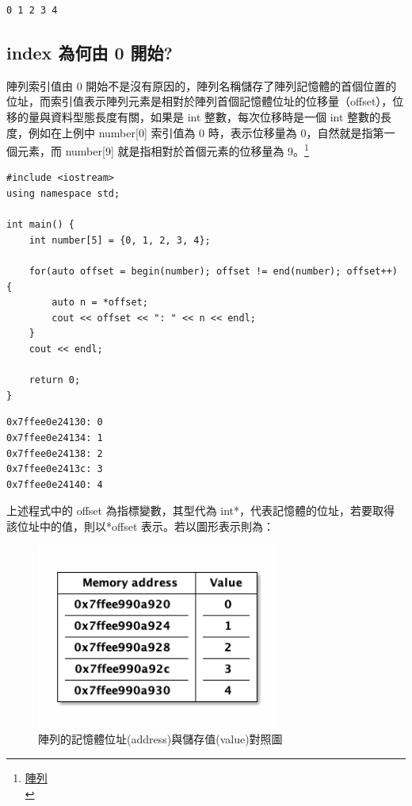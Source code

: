 \documentclass[a4paper,12pt]{article}
\begin{document}
\begin{verbatim}
0 1 2 3 4
\end{verbatim}
\subsection{index 為何由 0 開始?}
\label{sec:org2540741}
陣列索引值由 0 開始不是沒有原因的，陣列名稱儲存了陣列記憶體的首個位置的位址，而索引值表示陣列元素是相對於陣列首個記憶體位址的位移量（offset），位移的量與資料型態長度有關，如果是 int 整數，每次位移時是一個 int 整數的長度，例如在上例中 number[0] 索引值為 0 時，表示位移量為 0，自然就是指第一個元素，而 number[9] 就是指相對於首個元素的位移量為 9。\footnote{\href{https://openhome.cc/Gossip/CppGossip/OneDimArray.html}{陣列}\\}\\

\lstset{breaklines=true,language=cpp,label= ,caption= ,captionpos=b,firstnumber=1,numbers=left}
\begin{lstlisting}
#include <iostream>
using namespace std;

int main() {
    int number[5] = {0, 1, 2, 3, 4};

    for(auto offset = begin(number); offset != end(number); offset++) {
        auto n = *offset;
        cout << offset << ": " << n << endl;
    }
    cout << endl;

    return 0;
}
\end{lstlisting}

\begin{verbatim}
0x7ffee0e24130: 0
0x7ffee0e24134: 1
0x7ffee0e24138: 2
0x7ffee0e2413c: 3
0x7ffee0e24140: 4
\end{verbatim}

上述程式中的 offset 為指標變數，其型代為 int*，代表記憶體的位址，若要取得該位址中的值，則以*offset 表示。若以圖形表示則為：\\
\begin{figure}[htbp]
\centering
\includegraphics[width=300]{images/address.png}
\caption{\label{fig:Memory-Value}陣列的記憶體位址(address)與儲存值(value)對照圖}
\end{figure}
\end{document}
